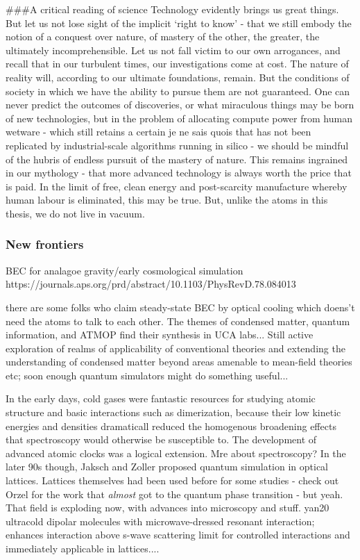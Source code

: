 \#\#\#A critical reading of science Technology evidently brings us great
things.
	But let us not lose sight of the implicit `right to know' - that
we still embody the notion of a conquest over nature, of mastery of the
other, the greater, the ultimately incomprehensible.
	Let us not fall
victim to our own arrogances, and recall that in our turbulent times,
our investigations come at cost.
	The nature of reality will, according
to our ultimate foundations, remain.
	But the conditions of society in
which we have the ability to pursue them are not guaranteed.
	One can
never predict the outcomes of discoveries, or what miraculous things may
be born of new technologies, but in the problem of allocating compute
power from human wetware - which still retains a certain je ne sais
quois that has not been replicated by industrial-scale algorithms
running in silico - we should be mindful of the hubris of endless
pursuit of the mastery of nature.
	This remains ingrained in our
mythology - that more advanced technology is always worth the price that
is paid.
	In the limit of free, clean energy and post-scarcity
manufacture whereby human labour is eliminated, this may be true.
	But,
unlike the atoms in this thesis, we do not live in vacuum.

\subsubsection{New frontiers}

	BEC for analagoe gravity/early cosmological simulation
		https://journals.aps.org/prd/abstract/10.1103/PhysRevD.78.084013

	there are some folks who claim steady-state BEC by optical cooling which doens't need the atoms to talk to each other.
	The themes of condensed matter, quantum information, and ATMOP find their synthesis in UCA labs...
	Still active exploration of realms of applicability of conventional theories and extending the understanding of condensed matter beyond areas amenable to mean-field theories etc; soon enough quantum simulators might do something useful... 
	

	In the early days, cold gases were fantastic resources for studying atomic structure and basic interactions such as dimerization, because their low kinetic energies and densities dramaticall reduced the homogenous broadening effects that spectroscopy would otherwise be susceptible to. The development of advanced atomic clocks was a logical extension. Mre about spectroscopy? In the later 90s though, Jaksch and Zoller proposed quantum simulation in optical lattices. Lattices themselves had been used before for some studies - check out Orzel for the work that \emph{almost} got to the quantum phase transition - but yeah. That field is exploding now, with advances into microscopy and stuff. 	yan20 ultracold dipolar molecules with microwave-dressed resonant interaction; enhances interaction above s-wave scattering limit for controlled interactions and immediately applicable in lattices....

